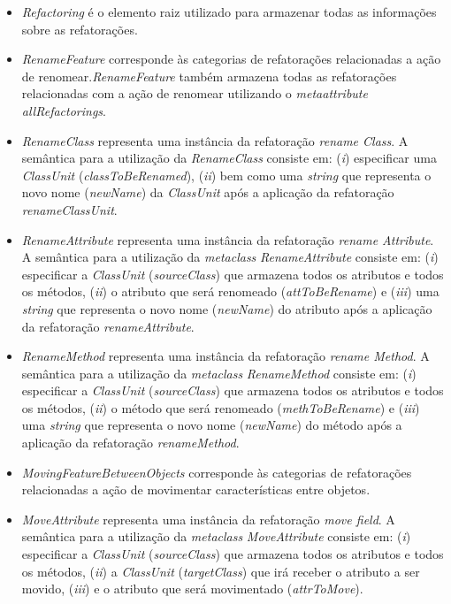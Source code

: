 \begin{itemize}

\item \textit{Refactoring} é o elemento raiz utilizado para armazenar todas as informações sobre as refatorações.

\item \textit{RenameFeature} corresponde às categorias de refatorações relacionadas a ação de renomear.\textit{RenameFeature} também armazena todas as refatorações relacionadas com a ação de renomear utilizando o \textit{metaattribute} \textit{allRefactorings}.

\item \textit{RenameClass} representa uma instância da refatoração \textit{rename Class}.  A semântica para a utilização da \textit{RenameClass} consiste em: (\textit{i}) especificar uma \textit{ClassUnit} (\textit{classToBeRenamed}), (\textit{ii}) bem como uma \textit{string} que representa o novo nome (\textit{newName}) da \textit{ClassUnit} após a aplicação da refatoração \textit{renameClassUnit}.

\item \textit{RenameAttribute} representa uma instância da refatoração \textit{rename Attribute}. A semântica para a utilização da \textit{metaclass} \textit{RenameAttribute} consiste em: (\textit{i}) especificar a \textit{ClassUnit} (\textit{sourceClass}) que armazena todos os atributos e todos os métodos, (\textit{ii}) o atributo que será renomeado (\textit{attToBeRename}) e (\textit{iii}) uma \textit{string} que representa o novo nome (\textit{newName}) do atributo após a aplicação da refatoração \textit{renameAttribute}.

\item \textit{RenameMethod} representa uma instância da refatoração \textit{rename Method}. A semântica para a utilização da \textit{metaclass} \textit{RenameMethod} consiste em: (\textit{i}) especificar a \textit{ClassUnit} (\textit{sourceClass}) que armazena todos os atributos e todos os métodos, (\textit{ii}) o método que será renomeado (\textit{methToBeRename}) e (\textit{iii}) uma \textit{string} que representa o novo nome (\textit{newName}) do método após a aplicação da refatoração \textit{renameMethod}.

\item \textit{MovingFeatureBetweenObjects} corresponde às categorias de refatorações relacionadas a ação de movimentar características entre objetos.

\item \textit{MoveAttribute} representa uma instância da refatoração \textit{move field}. A semântica para a utilização da \textit{metaclass} \textit{MoveAttribute} consiste em: (\textit{i}) especificar a \textit{ClassUnit} (\textit{sourceClass}) que armazena todos os atributos e todos os métodos, (\textit{ii}) a \textit{ClassUnit} (\textit{targetClass}) que irá receber o atributo a ser movido, (\textit{iii}) e o atributo que será movimentado (\textit{attrToMove}).  


\end{itemize}
